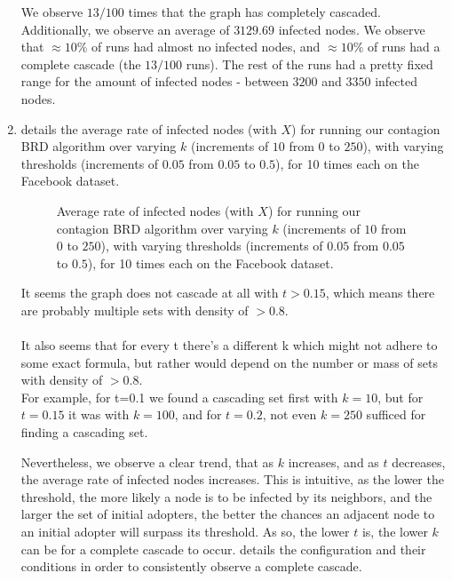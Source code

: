 \documentclass{article}
\begin{document}
\begin{enumerate}[label=(\alph*)]
    \FloatBarrier

    We observe $13/100$ times that the graph has completely cascaded. Additionally, we observe an average of $3129.69$ infected nodes. We observe that $\approx 10\%$ of runs had almost no infected nodes, and $\approx 10\%$ of runs had a complete cascade (the $13/100$ runs). The rest of the runs had a pretty fixed range for the amount of infected nodes - between $3200$ and $3350$ infected nodes. 

    \item {} details the average rate of infected nodes (with $X$) for running our contagion BRD algorithm over varying $k$ (increments of $10$ from $0$ to $250$), with varying thresholds (increments of $0.05$ from $0.05$ to $0.5$), for 10 times each on the Facebook dataset.
    
    \begin{figure*}[h]
        \centering
        \resizebox{0.6\textwidth}{!}{
            
        }
        \caption{Average rate of infected nodes (with $X$) for running our contagion BRD algorithm over varying $k$ (increments of $10$ from $0$ to $250$), with varying thresholds (increments of $0.05$ from $0.05$ to $0.5$), for 10 times each on the Facebook dataset.}
        \label{fig:q9c}
    \end{figure*}

    \FloatBarrier
    
    It seems the graph does not cascade at all with $t>0.15$, which means there are probably multiple sets with density of $>0.8$. \\\\
    It also seems that for every t there's a different k which might not adhere to some exact formula, but rather would depend on the number or mass of sets with density of $>0.8$. \\
    For example, for t=0.1 we found a cascading set first with $k=10$, but for $t=0.15$ it was with $k=100$, and for $t=0.2$, not even $k=250$ sufficed for finding a cascading set.

    Nevertheless, we observe a clear trend, that as $k$ increases, and as $t$ decreases, the average rate of infected nodes increases. This is intuitive, as the lower the threshold, the more likely a node is to be infected by its neighbors, and the larger the set of initial adopters, the better the chances an adjacent node to an initial adopter will surpass its threshold. As so, the lower $t$ is, the lower $k$ can be for a complete cascade to occur.  details the configuration and their conditions in order to consistently observe a complete cascade.


\end{enumerate}
\end{document}
